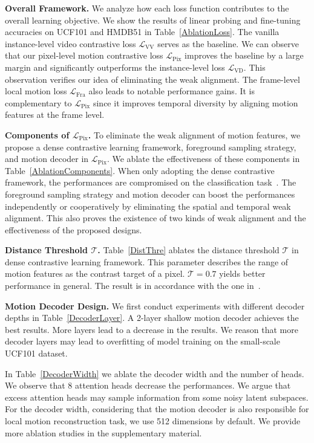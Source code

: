 \documentclass[sigconf,screen]{acmart}
\begin{document}
\noindent
{\bf Overall Framework.} We analyze how each loss function contributes to the overall learning objective. We show the results of linear probing and fine-tuning accuracies on UCF101 and HMDB51 in Table~\ref{AblationLoss}. The vanilla instance-level video contrastive loss $\mathcal{L}_{\mathrm{VV}}$ serves as the baseline. We can observe that our pixel-level motion contrastive loss $\mathcal{L}_{\mathrm{Pix}}$ improves the baseline by a large margin and significantly outperforms the instance-level loss $\mathcal{L}_{\mathrm{VD}}$. This observation verifies our idea of eliminating the weak alignment. The frame-level local motion loss $\mathcal{L}_{\mathrm{Fra}}$ also leads to notable performance gains. It is complementary to $\mathcal{L}_{\mathrm{Pix}}$ since it improves temporal diversity by aligning motion features at the frame level.

\noindent
{\bf Components of $\mathcal{L}_{\mathrm{Pix}}$.} To eliminate the weak alignment of motion features, we propose a dense contrastive learning framework, foreground sampling strategy, and motion decoder in $\mathcal{L}_{\mathrm{Pix}}$. We ablate the effectiveness of these components in Table~\ref{AblationComponents}. When only adopting the dense contrastive framework, the performances are compromised on the classification task~\cite{DetCo}. The foreground sampling strategy and motion decoder can boost the performances independently or cooperatively by eliminating the spatial and temporal weak alignment. This also proves the existence of two kinds of weak alignment and the effectiveness of the proposed designs.

\noindent
{\bf Distance Threshold $\mathcal{T}$.} Table~\ref{DistThre} ablates the distance threshold $\mathcal{T}$ in dense contrastive learning framework. This parameter describes the range of motion features as the contrast target of a pixel. $\mathcal{T}=0.7$ yields better performance in general. The result is in accordance with the one in~\cite{PixPro}.

\noindent
{\bf Motion Decoder Design.} We first conduct experiments with different decoder depths in Table~\ref{DecoderLayer}. A 2-layer shallow motion decoder achieves the best results. More layers lead to a decrease in the results. We reason that more decoder layers may lead to overfitting of model training on the small-scale UCF101 dataset.

In Table~\ref{DecoderWidth} we ablate the decoder width and the number of heads. We observe that 8 attention heads decrease the performances. We argue that excess attention heads may sample information from some noisy latent subspaces. For the decoder width, considering that the motion decoder is also responsible for local motion reconstruction task, we use 512 dimensions by default. We provide more ablation studies in the supplementary material.
\end{document}

